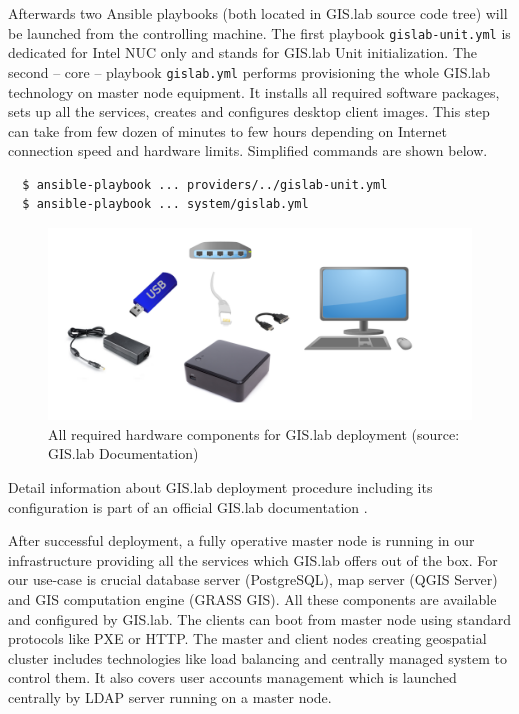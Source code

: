 \documentclass{isprs}
\begin{document}
Afterwards two Ansible playbooks (both located in GIS.lab source code
tree) will be launched from the controlling machine. The first
playbook \texttt{gislab-unit.yml} is dedicated for Intel NUC only and
stands for GIS.lab Unit initialization. The second -- core -- playbook
\texttt{gislab.yml} performs provisioning the whole GIS.lab technology
on master node equipment. It installs all required software packages,
sets up all the services, creates and configures desktop client
images. This step can take from few dozen of minutes to few hours
depending on Internet connection speed and hardware limits. Simplified
commands are shown below.

\begin{lstlisting}
  $ ansible-playbook ... providers/../gislab-unit.yml
  $ ansible-playbook ... system/gislab.yml
\end{lstlisting}

\begin{figure}[ht!]
\begin{center}
  \includegraphics[width=1.0\columnwidth]{figures/installation-unit.png}
  \caption{All required hardware components for GIS.lab deployment
    (source: GIS.lab Documentation)}
\label{fig:gislab_infrastructure}
\end{center}
\end{figure}

Detail information about GIS.lab deployment procedure including its
configuration is part of an official GIS.lab documentation
\cite{gislab-docs}.

After successful deployment, a fully operative master node is running
in our infrastructure providing all the services which GIS.lab offers
out of the box. For our use-case is crucial database server
(PostgreSQL), map server (QGIS Server) and GIS computation engine
(GRASS GIS). All these components are available and configured by
GIS.lab. The clients can boot from master node using standard
protocols like PXE or HTTP. The master and client nodes creating
geospatial cluster includes technologies like load balancing and
centrally managed system to control them. It also covers user accounts
management which is launched centrally by LDAP server running on a
master node.
\end{document}
